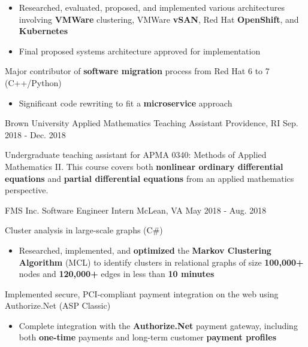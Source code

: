 \begin{cventries}
{\begin{cvitems}
            \begin{itemize}
                \item{Researched, evaluated, proposed, and implemented various architectures involving \textbf{VMWare} clustering, VMWare \textbf{vSAN}, Red Hat \textbf{OpenShift}, and \textbf{Kubernetes}}
                \item{Final proposed systems architecture approved for implementation}
            \end{itemize}
        \item{Major contributor of \textbf{software migration} process from Red Hat 6 to 7 (C++/Python)}
            \begin{itemize}
                \item{Significant code rewriting to fit a \textbf{microservice} approach}
            \end{itemize}
        \end{cvitems}
    }
    \cventry
	{Brown University}
	{Applied Mathematics Teaching Assistant}
	{Providence, RI}
	{Sep. 2018 - Dec. 2018}
    {
        \begin{cvitems}
		\item{Undergraduate teaching assistant for APMA 0340: Methods of Applied Mathematics II. This course covers both \textbf{nonlinear ordinary differential equations} and \textbf{partial differential equations} from an applied mathematics perspective.}
        \end{cvitems}
    }
    \cventry
	{FMS Inc.}
    {Software Engineer Intern}
    {McLean, VA}
    {May 2018 - Aug. 2018}
    {
        \begin{cvitems}
		\item{Cluster analysis in large-scale graphs (C\#)}
			\begin{itemize}
				\item{Researched, implemented, and \textbf{optimized} the \textbf{Markov Clustering Algorithm} (MCL) to identify clusters in relational graphs of size \textbf{100,000+} nodes and \textbf{120,000+} edges in less than \textbf{10 minutes}}
			\end{itemize}
		\item{Implemented secure, PCI-compliant payment integration on the web using Authorize.Net (ASP Classic)}
			\begin{itemize}
				\item{Complete integration with the \textbf{Authorize.Net} payment gateway, including both \textbf{one-time} payments and long-term customer \textbf{payment profiles}}

\end{itemize}
\end{cvitems}}
\end{cventries}
